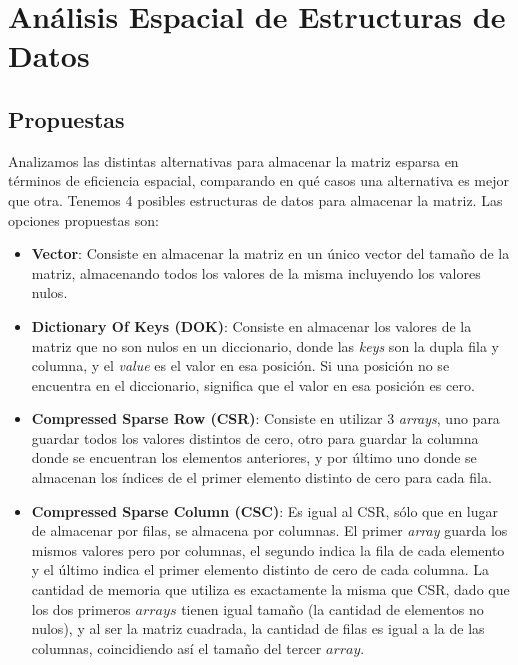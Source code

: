 \section{Análisis Espacial de Estructuras de Datos}
\subsection{Propuestas}
Analizamos las distintas alternativas para almacenar la matriz esparsa en términos de eficiencia espacial, comparando en qué casos una alternativa es mejor que otra. Tenemos 4 posibles estructuras de datos para almacenar la matriz. Las opciones propuestas son: \\

\begin{itemize}
	\item \textbf{Vector}: Consiste en almacenar la matriz en un único vector del tamaño de la matriz, almacenando todos los valores de la misma incluyendo los valores nulos.  
	\item \textbf{Dictionary Of Keys (DOK)}: Consiste en almacenar los valores de la matriz que no son nulos en un diccionario, donde las \textit{keys} son la dupla fila y columna, y el \textit{value} es el valor en esa posición. Si una posición no se encuentra en el diccionario, significa que el valor en esa posición es cero.
	\item \textbf{Compressed Sparse Row (CSR)}: Consiste en utilizar 3 \textit{arrays}, uno para guardar todos los valores distintos de cero, otro para guardar la columna donde se encuentran los elementos anteriores, y por último uno donde se almacenan los índices de el primer elemento distinto de cero para cada fila.
	\item \textbf{Compressed Sparse Column (CSC)}: Es igual al CSR, sólo que en lugar de almacenar por filas, se almacena por columnas. El primer \textit{array} guarda los mismos valores pero por columnas, el segundo indica la fila de cada elemento y el último indica el primer elemento distinto de cero de cada columna. La cantidad de memoria que utiliza es exactamente la misma que CSR, dado que los dos primeros $arrays$ tienen igual tamaño (la cantidad de elementos no nulos), y al ser la matriz cuadrada, la cantidad de filas es igual a la de las columnas, coincidiendo así el tamaño del tercer $array$.
\end{itemize}

